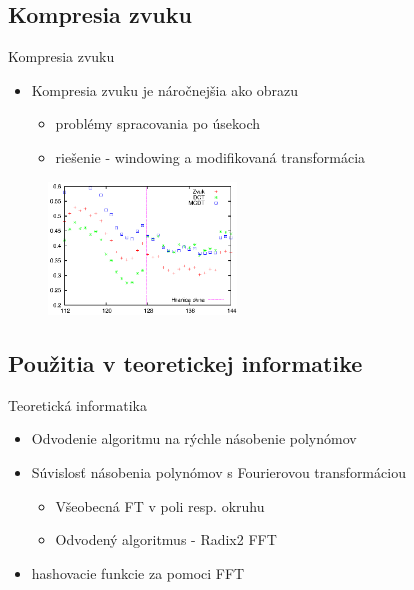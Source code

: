 \documentclass{beamer}
\begin{document}
\subsection{Kompresia zvuku}
\begin{frame}{Kompresia zvuku}
    \begin{itemize}
        \item Kompresia zvuku je náročnejšia ako obrazu
            \begin{itemize}
            \item problémy spracovania po úsekoch
            \item riešenie - windowing a modifikovaná transformácia
            \end{itemize}
    \end{itemize}
    \begin{figure}
        \includegraphics[width=5cm]{obrazky/dct_vs_mdct}
    \end{figure}
\end{frame}

\subsection{Použitia v teoretickej informatike}
\begin{frame}{Teoretická informatika}
    \begin{itemize}
        \item Odvodenie algoritmu na rýchle násobenie polynómov
        \item Súvislosť násobenia polynómov s Fourierovou
        transformáciou
            \begin{itemize}
                \item Všeobecná FT v poli resp. okruhu
                \item Odvodený algoritmus - Radix2 FFT
            \end{itemize}
        \item hashovacie funkcie za pomoci FFT
    \end{itemize}
\end{frame}
\end{document}
